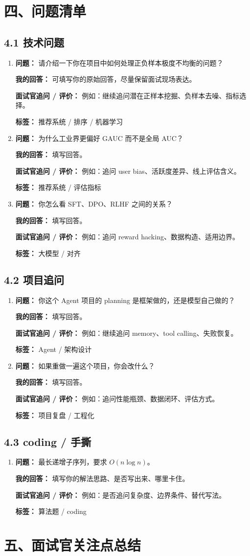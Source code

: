 \documentclass[UTF8,a4paper,11pt]{ctexart}
\newcommand{\questionentry}[4]{
  \item \textbf{问题：} #1

  \textbf{我的回答：} #2

  \textbf{面试官追问 / 评价：} #3

  \textbf{标签：} #4
}
\begin{document}
\section*{四、问题清单}

\subsection*{4.1 技术问题}
\begin{enumerate}
  \questionentry
    {请介绍一下你在项目中如何处理正负样本极度不均衡的问题？}
    {可填写你的原始回答，尽量保留面试现场表达。}
    {例如：继续追问潜在正样本挖掘、负样本去噪、指标选择。}
    {推荐系统 / 排序 / 机器学习}

  \questionentry
    {为什么工业界更偏好 GAUC 而不是全局 AUC？}
    {填写回答。}
    {例如：追问 user bias、活跃度差异、线上评估含义。}
    {推荐系统 / 评估指标}

  \questionentry
    {你怎么看 SFT、DPO、RLHF 之间的关系？}
    {填写回答。}
    {例如：追问 reward hacking、数据构造、适用边界。}
    {大模型 / 对齐}
\end{enumerate}

\subsection*{4.2 项目追问}
\begin{enumerate}
  \questionentry
    {你这个 Agent 项目的 planning 是框架做的，还是模型自己做的？}
    {填写回答。}
    {例如：继续追问 memory、tool calling、失败恢复。}
    {Agent / 架构设计}

  \questionentry
    {如果重做一遍这个项目，你会改什么？}
    {填写回答。}
    {例如：追问性能瓶颈、数据闭环、评估方式。}
    {项目复盘 / 工程化}
\end{enumerate}

\subsection*{4.3 coding / 手撕}
\begin{enumerate}
  \questionentry
    {最长递增子序列，要求 $O(n \log n)$。}
    {填写你的解法思路、是否写出来、哪里卡住。}
    {例如：是否追问复杂度、边界条件、替代写法。}
    {算法题 / coding}
\end{enumerate}

\section*{五、面试官关注点总结}
\end{document}
